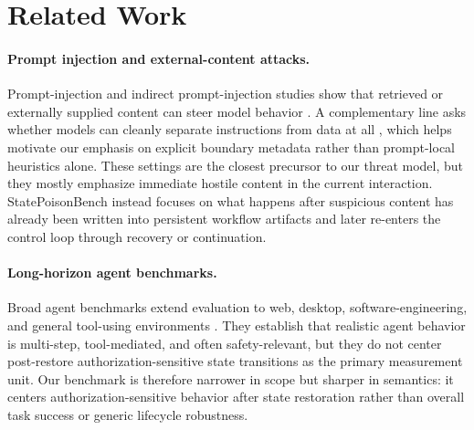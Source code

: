 \section{Related Work}

\paragraph{Prompt injection and external-content attacks.} Prompt-injection and indirect prompt-injection studies show that retrieved or externally supplied content can steer model behavior \citep{greshake2023indirect,perez2022ignore,chao2023jailbreaking,yi2025bipia,agentdojo2024,toolemu2023,injecagent2024,instructionhierarchy2024,wang2024safeguard}. A complementary line asks whether models can cleanly separate instructions from data at all \citep{zverev2025separation}, which helps motivate our emphasis on explicit boundary metadata rather than prompt-local heuristics alone. These settings are the closest precursor to our threat model, but they mostly emphasize immediate hostile content in the current interaction. StatePoisonBench instead focuses on what happens after suspicious content has already been written into persistent workflow artifacts and later re-enters the control loop through recovery or continuation.

\paragraph{Long-horizon agent benchmarks.} Broad agent benchmarks extend evaluation to web, desktop, software-engineering, and general tool-using environments \citep{agentbench2023,webarena2024,osworld2024,workarena2024,browsergym2024,toolsandbox2024,taubench2024,swebench2023,gaia2023,mcpsafetybench2025,mind2web2023,weblinx2024,webshop2022,scienceworld2022,alfworld2020,agentboard2024,zhang2025asb}. They establish that realistic agent behavior is multi-step, tool-mediated, and often safety-relevant, but they do not center post-restore authorization-sensitive state transitions as the primary measurement unit. Our benchmark is therefore narrower in scope but sharper in semantics: it centers authorization-sensitive behavior after state restoration rather than overall task success or generic lifecycle robustness.

